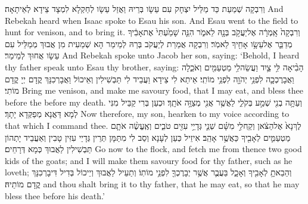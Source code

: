 {וְרִבְקָה שְׁמַעַת כַּד מַלֵּיל יִצְחָק עִם עֵשָׂו בְּרֵיהּ וַאֲזַל עֵשָׂו לְחַקְלָא לִמְצָד צֵידָא לְאֵיתָאָה׃}
{And Rebekah heard when Isaac spoke to Esau his son. And Esau went to the field to hunt for venison, and to bring it.}{}
{וְרִבְקָה֙ אָֽמְרָ֔ה אֶל\maqqaf יַעֲקֹ֥ב בְּנָ֖הּ לֵאמֹ֑ר הִנֵּ֤ה שָׁמַ֙עְתִּי֙ אֶת\maqqaf אָבִ֔יךָ מְדַבֵּ֛ר אֶל\maqqaf עֵשָׂ֥ו אָחִ֖יךָ לֵאמֹֽר׃}
{וְרִבְקָה אֲמַרַת לְיַעֲקֹב בְּרַהּ לְמֵימַר הָא שְׁמַעִית מִן אֲבוּךְ מְמַלֵּיל עִם עֵשָׂו אֲחוּךְ לְמֵימַר׃}
{And Rebekah spoke unto Jacob her son, saying: ‘Behold, I heard thy father speak unto Esau thy brother, saying:}{}
{הָבִ֨יאָה לִּ֥י צַ֛יִד וַעֲשֵׂה\maqqaf לִ֥י מַטְעַמִּ֖ים וְאֹכֵ֑לָה וַאֲבָרֶכְכָ֛ה לִפְנֵ֥י יְהֹוָ֖ה לִפְנֵ֥י מוֹתִֽי׃}
{אֵיתַא לִי צֵידָא וַעֲבֵיד לִי תַּבְשִׁילִין וְאֵיכוֹל וַאֲבָרְכִנָּךְ קֳדָם יְיָ קֳדָם מוֹתִי׃}
{Bring me venison, and make me savoury food, that I may eat, and bless thee before the \lord\space before my death.}{}
{וְעַתָּ֥ה בְנִ֖י שְׁמַ֣ע בְּקֹלִ֑י לַאֲשֶׁ֥ר אֲנִ֖י מְצַוָּ֥ה אֹתָֽךְ׃}
{וּכְעַן בְּרִי קַבֵּיל מִנִּי לְמָא דַּאֲנָא מְפַקְּדָא יָתָךְ׃}
{Now therefore, my son, hearken to my voice according to that which I command thee.}{}
{לֶךְ\maqqaf נָא֙ אֶל\maqqaf הַצֹּ֔אן וְקַֽח\maqqaf לִ֣י מִשָּׁ֗ם שְׁנֵ֛י גְּדָיֵ֥י עִזִּ֖ים טֹבִ֑ים וְאֶֽעֱשֶׂ֨ה אֹתָ֧ם מַטְעַמִּ֛ים לְאָבִ֖יךָ כַּאֲשֶׁ֥ר אָהֵֽב׃}
{אִיזֵיל כְּעַן לְעָנָא וְסַב לִי מִתַּמָּן תְּרֵין גְּדָיֵי עִזִּין טָבִין וְאַעֲבֵיד יָתְהוֹן תַּבְשִׁילִין לַאֲבוּךְ כְּמָא דְּרָחֵים׃}
{Go now to the flock, and fetch me from thence two good kids of the goats; and I will make them savoury food for thy father, such as he loveth;}{}
{וְהֵבֵאתָ֥ לְאָבִ֖יךָ וְאָכָ֑ל בַּעֲבֻ֛ר אֲשֶׁ֥ר יְבָרֶכְךָ֖ לִפְנֵ֥י מוֹתֽוֹ׃}
{וְתַעֵיל לַאֲבוּךְ וְיֵיכוֹל בְּדִיל דִּיבָרְכִנָּךְ קֳדָם מוֹתֵיהּ׃}
{and thou shalt bring it to thy father, that he may eat, so that he may bless thee before his death.’}{}
